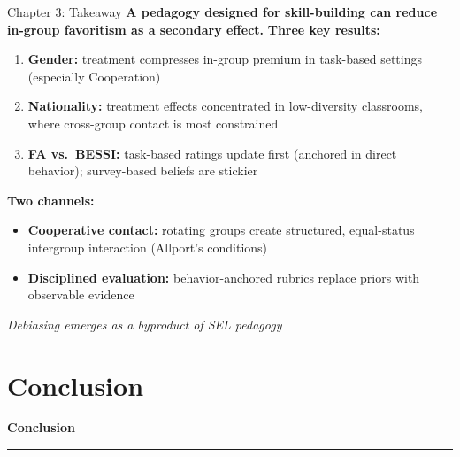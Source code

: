 \documentclass[xcolor=usenames,dvipsnames]{beamer}
\begin{document}
\begin{frame}{Chapter 3: Takeaway}
\small
\textbf{A pedagogy designed for skill-building can reduce in-group favoritism as a secondary effect.}
\vspace{0.3cm}
\textbf{Three key results:}
\begin{enumerate}
    \item \textbf{Gender:} treatment compresses in-group premium in task-based settings (especially Cooperation)
    \item \textbf{Nationality:} treatment effects concentrated in low-diversity classrooms, where cross-group contact is most constrained
    \item \textbf{FA vs.\ BESSI:} task-based ratings update first (anchored in direct behavior); survey-based beliefs are stickier
\end{enumerate}
\vspace{0.3cm}
\textbf{Two channels:}
\begin{itemize}
    \item \textcolor{HopBlue}{\textbf{Cooperative contact:}} rotating groups create structured, equal-status intergroup interaction (Allport's conditions)
    \item \textcolor{HopBlue}{\textbf{Disciplined evaluation:}} behavior-anchored rubrics replace priors with observable evidence
\end{itemize}
\vspace{0.2cm}
\textit{Debiasing emerges as a byproduct of SEL pedagogy}
\end{frame}
\section{Conclusion}
\begin{frame}[plain]
\vspace{2.5cm}
{\LARGE \textbf{Conclusion}}\\
{\color{HopBlue}\rule{0.4\linewidth}{2pt}}
\end{frame}
\end{document}
